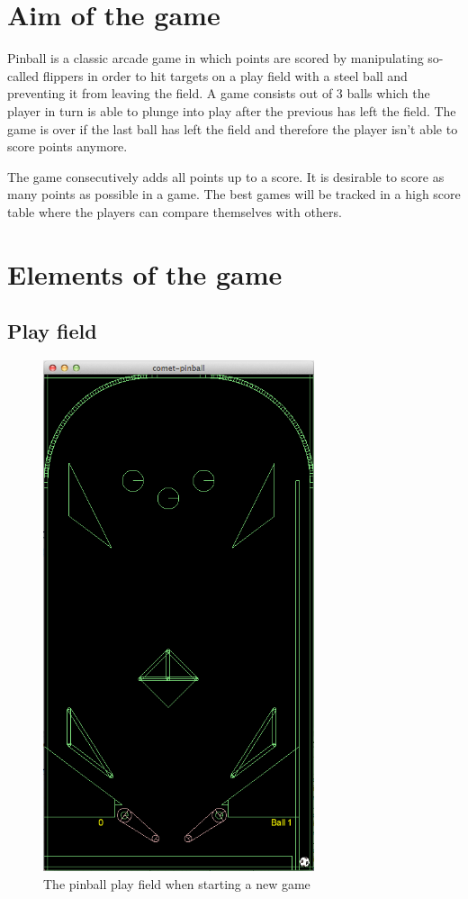 \documentclass[fontsize=12pt,
               paper=a4,
               twoside=false,
               parskip=half,
               ]{scrartcl}
\begin{document}
\newcommand{\doctitle}{Game manual}


\tableofcontents

\listoffigures

\section{Aim of the game}

Pinball is a classic arcade game in which points are scored by manipulating so-called flippers in order to hit targets on a play field with a steel ball and preventing it from leaving the field. A game consists out of 3 balls which the player in turn is able to plunge into play after the previous has left the field. The game is over if the last ball has left the field and therefore the player isn't able to score points anymore.

The game consecutively adds all points up to a score. It is desirable to score as many points as possible in a game. The best games will be tracked in a high score table where the players can compare themselves with others.

\section{Elements of the game}

\subsection{Play field}

\begin{figure}[h!]
	\centering
	\includegraphics[height=15cm]{./img/manual/playfield.png}
	\caption[The play field]{The pinball play field when starting a new game}
	\label{fig:playfield}
\end{figure}
\end{document}
